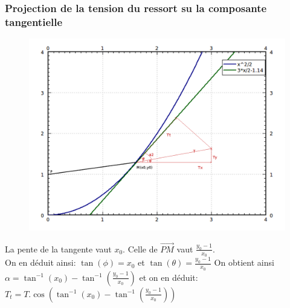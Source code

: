 \documentclass[10pt,a4paper]{article}
\begin{document}
\subsubsection{Projection de la tension du ressort su la composante tangentielle}
\begin{figure}[H]
	\includegraphics[scale=0.35]{GraphMathZoomProjectionT.png}
\end{figure} 

La pente de la tangente vaut $x_0$. Celle de $\vec{PM}$ vaut $\frac{y_0-1}{x_0}$.\\
On en déduit ainsi: $\tan(\phi)=x_0$ et $\tan(\theta)=\frac{y_0-1}{x_0}$
On obtient ainsi $\alpha=\tan^{-1}(x_0) - \tan^{-1}(\frac{y_0-1}{x_0})$ et on en déduit: $T_t=T.\cos(\tan^{-1}(x_0) - \tan^{-1}(\frac{y_0-1}{x_0}))$
\end{document}
